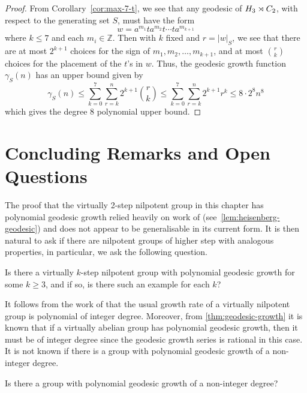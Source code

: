 \begin{proof}
	From Corollary~\ref{cor:max-7-t}, we see that any geodesic of $H_3 \rtimes C_2$, with respect to the generating set $S$, must have the form
	\[
	w = a^{m_1} t a^{m_2} t \cdots t a^{m_{k+1}}
	\]
	where $k \leq 7$ and each $m_i \in \mathbb{Z}$.
	Then with $k$ fixed and $r = |w|_S$, we see that there are at most $2^{k+1}$ choices for the sign of $m_1,m_2,\ldots,m_{k+1}$, and at most $\binom{r}{k}$ choices for the placement of the $t$'s in $w$.
	Thus, the geodesic growth function $\gamma_S(n)$ has an upper bound given by
	\[
		\gamma_S(n)
		\leq
			\sum_{k=0}^7
			\sum_{r=k}^n
			2^{k+1}
			\binom{r}{k}
		\leq
			\sum_{k=0}^7
			\sum_{r=k}^n
			2^{k+1}
			r^k
		\leq
			8 \cdot 2^8 n^{8}
	\]
	which gives the degree 8 polynomial upper bound.
\end{proof}

\section{Concluding Remarks and Open Questions}\label{sec:virt-heisenberg/concluding}

The proof that the virtually 2-step nilpotent group in this chapter has polynomial geodesic growth relied heavily on work of \citeauthor{blachere2003} (see~\cref{lem:heisenberg-geodesic}) and does not appear to be generalisable in its current form.
It is then natural to ask if there are nilpotent groups of higher step with analogous properties, in particular, we ask the following question.

\begin{question}
	Is there a virtually $k$-step nilpotent group with polynomial geodesic growth for some $k \geqslant 3$, and if so, is there such an example for each $k$?
\end{question}

It follows from the work of \textcite[Theorem~2]{bass1972} that the usual growth rate of a virtually nilpotent group is polynomial of integer degree.
Moreover, from \cref{thm:geodesic-growth} it is known that if a virtually abelian group has polynomial geodesic growth, then it must be of integer degree since the geodesic growth series is rational in this case.
It is not known if there is a group with polynomial geodesic growth of a non-integer degree.

\begin{question}
	Is there a group with polynomial geodesic growth of a non-integer degree?
\end{question}

